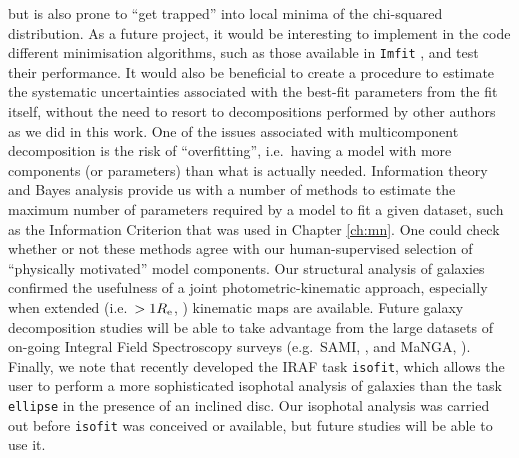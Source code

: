but is also prone to ``get trapped'' into local minima of the chi-squared distribution. 
As a future project, it would be interesting to implement in the code different minimisation algorithms, 
such as those available in {\tt Imfit} \citep{imfit},  
and test their performance. 
It would also be beneficial to create a procedure to estimate the systematic uncertainties 
associated with the best-fit parameters from the fit itself, 
without the need to resort to decompositions performed by other authors as we did in this work. 
One of the issues associated with multicomponent decomposition is the risk of ``overfitting'', 
i.e.~having a model with more components (or parameters) than what is actually needed. 
Information theory and Bayes analysis provide us with a number of methods 
to estimate the maximum number of parameters required by a model 
to fit a given dataset, 
such as the \citet{akaike1974} Information Criterion that was used in Chapter \ref{ch:mn}. 
One could check whether or not these methods agree with our human-supervised selection 
of ``physically motivated'' model components. 
Our structural analysis of galaxies confirmed the usefulness of a joint photometric-kinematic approach, 
especially when extended (i.e.~$> 1 R_{\rm e}$, \citealt{arnold2014}) kinematic maps are available. 
Future galaxy decomposition studies will be able to take advantage from the large datasets 
of on-going Integral Field Spectroscopy surveys (e.g.~SAMI, \citealt{croom2012}, and MaNGA, \citealt{law2014}). 
Finally, we note that \citet{ciambur2015} recently developed the IRAF task {\tt isofit}, 
which allows the user to perform a more sophisticated isophotal analysis of galaxies than the task {\tt ellipse} 
in the presence of an inclined disc. 
Our isophotal analysis was carried out before {\tt isofit} was conceived or available, 
but future studies will be able to use it. \\

